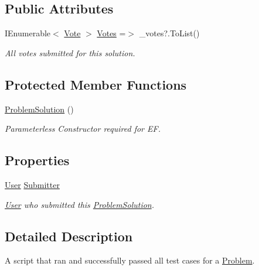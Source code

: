 \subsection*{Public Attributes}
\begin{DoxyCompactItemize}
\item 
I\+Enumerable$<$ \mbox{\hyperlink{class_code_a_friend_1_1_data_model_1_1_vote}{Vote}} $>$ \mbox{\hyperlink{class_code_a_friend_1_1_data_model_1_1_problem_solution_a6012ce280fdad237001766fb95a204ab}{Votes}} =$>$ \+\_\+votes?.To\+List()
\begin{DoxyCompactList}\small\item\em All votes submitted for this solution.\end{DoxyCompactList}\end{DoxyCompactItemize}
\subsection*{Protected Member Functions}
\begin{DoxyCompactItemize}
\item 
\mbox{\hyperlink{class_code_a_friend_1_1_data_model_1_1_problem_solution_aea496eef30d40476057177599c386555}{Problem\+Solution}} ()
\begin{DoxyCompactList}\small\item\em Parameterless Constructor required for EF.\end{DoxyCompactList}\end{DoxyCompactItemize}
\subsection*{Properties}
\begin{DoxyCompactItemize}
\item 
\mbox{\hyperlink{class_code_a_friend_1_1_data_model_1_1_user}{User}} \mbox{\hyperlink{class_code_a_friend_1_1_data_model_1_1_problem_solution_a3ca0acf918b42f59e4c8951b3e8cd68e}{Submitter}}
\begin{DoxyCompactList}\small\item\em \mbox{\hyperlink{class_code_a_friend_1_1_data_model_1_1_user}{User}} who submitted this \mbox{\hyperlink{class_code_a_friend_1_1_data_model_1_1_problem_solution}{Problem\+Solution}}.\end{DoxyCompactList}\end{DoxyCompactItemize}


\subsection{Detailed Description}
A script that ran and successfully passed all test cases for a \mbox{\hyperlink{class_code_a_friend_1_1_data_model_1_1_problem}{Problem}}.



